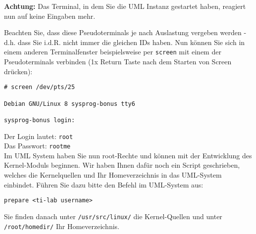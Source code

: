 \documentclass{article}
\begin{document}
{\bf Achtung:} Das Terminal, in dem Sie die UML Instanz gestartet
haben, reagiert nun auf keine Eingaben mehr.

Beachten Sie, dass diese Pseudoterminals je nach Auslastung vergeben
werden - d.h. dass Sie i.d.R. nicht immer die gleichen IDs haben. Nun
k{\"o}nnen Sie sich in einem anderen Terminalfenster beispielsweise
per \texttt{screen} mit einem der Pseudoterminals verbinden (1x Return
Taste nach dem Starten von Screen dr{\"u}cken):
\begin{verbatim}
# screen /dev/pts/25

Debian GNU/Linux 8 sysprog-bonus tty6

sysprog-bonus login: 
\end{verbatim}

Der Login lautet: \verb|root|\\
Das Passwort: \verb|rootme|\\
Im UML System haben Sie nun root-Rechte und k{\"o}nnen mit der
Entwicklung des Kernel-Moduls beginnen. Wir haben Ihnen daf{\"u}r noch
ein Script geschrieben, welches die Kernelquellen und Ihr
Homeverzeichnis in das UML-System einbindet. F{\"u}hren Sie dazu
bitte den Befehl im UML-System aus:
\begin{verbatim}
prepare <ti-lab username>
\end{verbatim}

Sie finden danach unter \texttt{/usr/src/linux/} die Kernel-Quellen
und unter \texttt{/root/homedir/} Ihr Homeverzeichnis.
\end{document}
